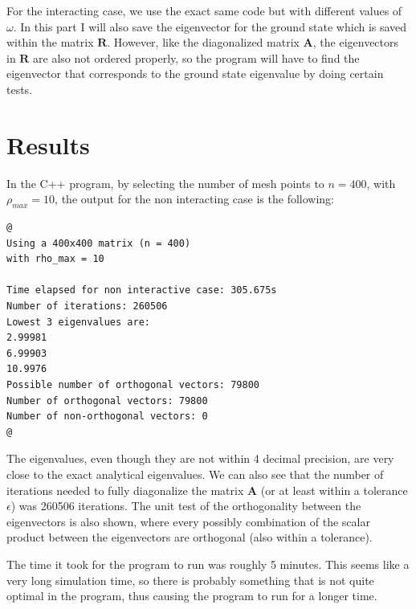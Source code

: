 \documentclass[12pt]{article}
\begin{document}
For the interacting case, we use the exact same code but with different values of $\omega$. In this part I will also save the eigenvector for the ground state which is saved within the matrix $\mathbf{R}$. However, like the diagonalized matrix $\mathbf{A}$, the eigenvectors in $\mathbf{R}$ are also not ordered properly, so the program will have to find the eigenvector that corresponds to the ground state eigenvalue by doing certain tests. 

\section{Results}
In the C++ program, by selecting the number of mesh points to $n=400$, with $\rho_{max} = 10$, the output for the non interacting case is the following:
\begin{lstlisting}
@
Using a 400x400 matrix (n = 400)
with rho_max = 10

Time elapsed for non interactive case: 305.675s
Number of iterations: 260506
Lowest 3 eigenvalues are: 
2.99981
6.99903
10.9976
Possible number of orthogonal vectors: 79800
Number of orthogonal vectors: 79800
Number of non-orthogonal vectors: 0
@
\end{lstlisting}
The eigenvalues, even though they are not within 4 decimal precision, are very close to the exact analytical eigenvalues. We can also see that the number of iterations needed to fully diagonalize the matrix $\mathbf{A}$ (or at least within a tolerance $\epsilon$) was 260506 iterations. The unit test of the orthogonality between the eigenvectors is also shown, where every possibly combination of the scalar product between the eigenvectors are orthogonal (also within a tolerance).

The time it took for the program to run was roughly 5 minutes. This seems like a very long simulation time, so there is probably something that is not quite optimal in the program, thus causing the program to run for a longer time.
\end{document}
